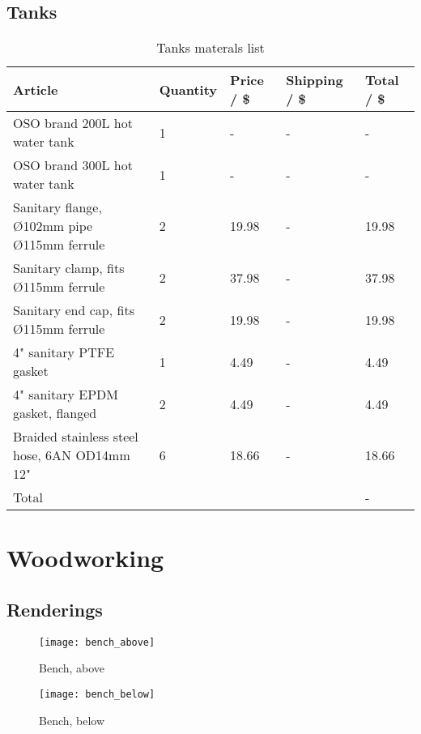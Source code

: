 \documentclass[11pt,fleqn,openany]{book} %
\begin{document}
\section{Tanks}

\begin{table}[ht!]
\centering
\begin{tabular}{l l l l l}
\toprule
Article & Quantity & Price / \$ & Shipping / \$ & Total / \$\\
\midrule
OSO brand 200L hot water tank & 1 & - & - & - \\
OSO brand 300L hot water tank & 1 & - & - & - \\
Sanitary flange, Ø102mm pipe Ø115mm ferrule & 2 & 19.98 & - & 19.98 \\
Sanitary clamp, fits Ø115mm ferrule & 2 & 37.98 & - & 37.98 \\
Sanitary end cap, fits Ø115mm ferrule & 2 & 19.98 & - & 19.98\\
4" sanitary PTFE gasket & 1 & 4.49 & - & 4.49 \\
4" sanitary EPDM gasket, flanged & 2 & 4.49 & - & 4.49 \\
Braided stainless steel hose, 6AN OD14mm 12" & 6 & 18.66 & - & 18.66\\
\bottomrule
Total & & & & -\\
\end{tabular}
\caption{Tanks materals list}
\end{table}



\chapter{Woodworking}

\section{Renderings}

\begin{figure}[h]
\centering\texttt{[image: bench\_above]}
\caption{Bench, above}
\label{bench_above}
\end{figure}

\begin{figure}[h]
\centering\texttt{[image: bench\_below]}
\caption{Bench, below}
\end{figure}
\end{document}
